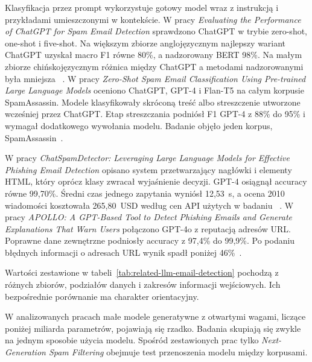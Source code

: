 Klasyfikacja przez prompt wykorzystuje gotowy model wraz z instrukcją i
przykładami umieszczonymi w kontekście. W pracy \emph{Evaluating the Performance
of ChatGPT for Spam Email Detection} sprawdzono ChatGPT w trybie zero-shot,
one-shot i five-shot. Na większym zbiorze anglojęzycznym najlepszy wariant
ChatGPT uzyskał macro F1 równe 80\%, a nadzorowany BERT 98\%. Na małym zbiorze
chińskojęzycznym różnica między ChatGPT a metodami nadzorowanymi była mniejsza
~\autocite{si-chatgpt-spam-2024}. W pracy \emph{Zero-Shot Spam Email
Classification Using Pre-trained Large Language Models} oceniono ChatGPT, GPT-4
i Flan-T5 na całym korpusie SpamAssassin. Modele klasyfikowały skróconą treść
albo streszczenie utworzone wcześniej przez ChatGPT. Etap streszczania podniósł
F1 GPT-4 z 88\% do 95\% i wymagał dodatkowego wywołania modelu. Badanie objęło
jeden korpus, SpamAssassin~\autocite{rojas-galeano-zero-shot-spam-2024}.

W pracy \emph{ChatSpamDetector: Leveraging Large Language Models for Effective
Phishing Email Detection} opisano system przetwarzający nagłówki i elementy
HTML, który oprócz klasy zwracał wyjaśnienie decyzji. GPT-4 osiągnął accuracy
równe 99,70\%. Średni czas jednego zapytania wyniósł 12,53~s, a ocena 2010
wiadomości kosztowała 265,80~USD według cen API użytych w badaniu
~\autocite{koide-chatspamdetector-2024}. W pracy \emph{APOLLO: A GPT-Based Tool
to Detect Phishing Emails and Generate Explanations That Warn Users} połączono
GPT-4o z reputacją adresów URL. Poprawne dane zewnętrzne podniosły accuracy z
97,4\% do 99,9\%. Po podaniu błędnych informacji o adresach URL wynik spadł
poniżej 46\%~\autocite{desolda-apollo-2025}.

Wartości zestawione w tabeli~\ref{tab:related-llm-email-detection} pochodzą z
różnych zbiorów, podziałów danych i zakresów informacji wejściowych. Ich
bezpośrednie porównanie ma charakter orientacyjny.

\begin{table}[!htbp]
\centering
\scriptsize
\resizebox{\textwidth}{!}{}
\caption{Badania nad wykorzystaniem modeli transformerowych i językowych do
klasyfikacji spamu oraz phishingu w poczcie elektronicznej.}
\label{tab:related-llm-email-detection}
\end{table}
\FloatBarrier

W analizowanych pracach małe modele generatywne z otwartymi wagami, liczące
poniżej miliarda parametrów, pojawiają się rzadko. Badania skupiają się zwykle
na jednym sposobie użycia modelu. Spośród zestawionych prac tylko
\emph{Next-Generation Spam Filtering} obejmuje test przenoszenia modelu między
korpusami.

